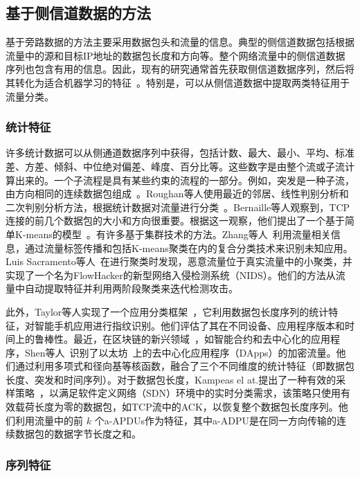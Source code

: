 \documentclass[degree=master,cjk-font=noto]{thuthesis}
\begin{document}
\subsection{基于侧信道数据的方法}


基于旁路数据的方法主要采用数据包头和流量的信息。典型的侧信道数据包括根据流量中的源和目标IP地址的数据包长度和方向等。整个网络流量中的侧信道数据序列也包含有用的信息。因此，现有的研究通常首先获取侧信道数据序列，然后将其转化为适合机器学习的特征~\cite{app_class}。特别是，可以从侧信道数据中提取两类特征用于流量分类。

\subsubsection{统计特征}


许多统计数据可以从侧通道数据序列中获得，包括计数、最大、最小、平均、标准差、方差、倾斜、中位绝对偏差、峰度、百分比等。这些数字是由整个流或子流计算出来的。一个子流程是具有某些约束的流程的一部分。例如，突发是一种子流，由方向相同的连续数据包组成~\cite{SSFW10}。Roughan等人使用最近的邻居、线性判别分析和二次判别分析方法，根据统计数据对流量进行分类~\cite{b11}。Bernaille等人观察到，TCP连接的前几个数据包的大小和方向很重要。根据这一观察，他们提出了一个基于简单K-means的模型~\cite{b12}。有许多基于集群技术的方法。Zhang等人~\cite{b15}利用流量相关信息，通过流量标签传播和包括K-means聚类在内的复合分类技术来识别未知应用。Luis Sacramento等人~\cite{flowhacker}在进行聚类时发现，恶意流量位于真实流量中的小聚类，并实现了一个名为FlowHacker的新型网络入侵检测系统（NIDS）。他们的方法从流量中自动提取特征并利用两阶段聚类来迭代检测攻击。

此外，Taylor等人实现了一个应用分类框架~\cite{app_class}，它利用数据包长度序列的统计特征，对智能手机应用进行指纹识别。他们评估了其在不同设备、应用程序版本和时间上的鲁棒性。最近，在区块链的新兴领域~\cite{chen2019tokenscope,EOS20}，如智能合约和去中心化的应用程序，Shen等人~\cite{DApps}识别了以太坊~\cite{8486401}上的去中心化应用程序（DApps）的加密流量。他们通过利用多项式和径向基等核函数，融合了三个不同维度的统计特征（即数据包长度、突发和时间序列）。对于数据包长度，Kampeas el at.提出了一种有效的采样策略~\cite{zero_length}，以满足软件定义网络（SDN）环境中的实时分类需求，该策略只使用有效载荷长度为零的数据包，如TCP流中的ACK，以恢复整个数据包长度序列。他们利用流量中的前 $k$ 个a-APDUs作为特征，其中a-ADPU是在同一方向传输的连续数据包的数据字节长度之和。

\subsubsection{序列特征}
\end{document}
